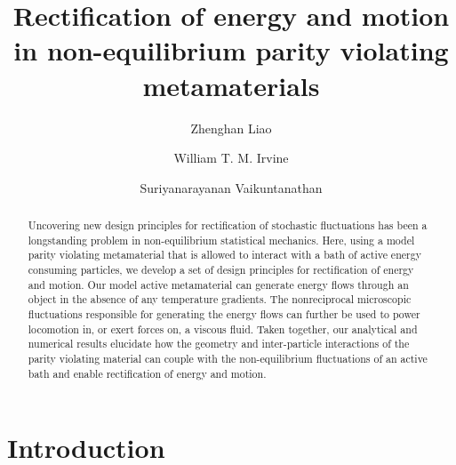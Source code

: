 \documentclass[
 preprint,
 preprintnumbers,
 amsmath,amssymb,
 aps,
 pre,
 longbibliography,
 superscriptaddress,
 10pt, twocolumn
]{revtex4-1}
\begin{document}
\newcommand{\eqnname}{Eq.}
\newcommand{\secname}{Sec.}


\title{Rectification of energy and motion in non-equilibrium parity violating metamaterials}


\author{Zhenghan Liao}
\author{William T. M. Irvine}
\author{Suriyanarayanan Vaikuntanathan}


\begin{abstract}
Uncovering new design principles for rectification of stochastic fluctuations has been a longstanding problem in non-equilibrium statistical mechanics. Here, using a model parity violating metamaterial that is allowed to interact with a bath of active energy consuming particles, we develop a set of design principles for rectification of energy and motion. Our model active metamaterial can generate energy flows through an object in the absence of any temperature gradients. The nonreciprocal microscopic fluctuations responsible for generating the energy flows can further be used to power locomotion in, or exert forces on, a viscous fluid. Taken together, our analytical and numerical results elucidate how the geometry and inter-particle interactions of the parity violating material can couple with the non-equilibrium fluctuations of an active bath and enable rectification of energy and motion.  
\end{abstract}

\maketitle

\section{Introduction} \label{sec:intro}
\end{document}
